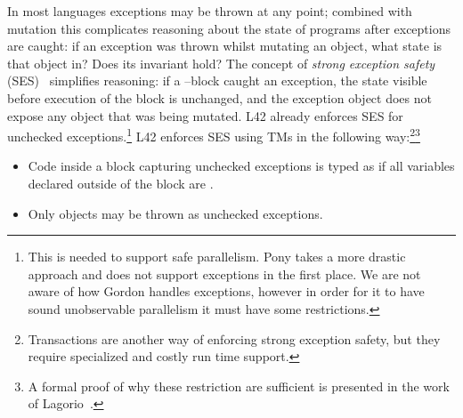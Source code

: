 {}\label{s:exceptions}
In most languages exceptions may be thrown at any point; combined with mutation this complicates reasoning about the state of programs after exceptions are caught: if an exception was thrown whilst mutating an object, what state is that object in? Does its invariant hold?
The concept of \emph{strong exception safety} (SES)~\cite{Abrahams2000,JOT:issue_2011_01/article1} simplifies reasoning:
if a \Q@try@--\Q@catch@ block caught an exception, the state visible before execution of the \Q@try@ block is unchanged, and the exception object does not expose any object that was being mutated.
L42 already enforces SES for unchecked exceptions.\footnote{%
This is needed to support safe parallelism. Pony takes a more drastic approach and does not support exceptions in the first place. 
We are not aware of how Gordon \etal handles exceptions, however in order for it to have sound unobservable parallelism it must have some restrictions.%
}
L42 enforces SES using TMs in the following way:\footnote{Transactions are another way of enforcing strong exception safety, but they require specialized and costly run time support.}\footnote{A formal proof of why these restriction are sufficient is presented in the work of Lagorio~\cite{JOT:issue_2011_01/article1}.}
\begin{itemize}
\item Code inside a \Q@try@ block capturing unchecked exceptions is typed as if all \Q@mut@ variables declared outside of the block are \Q@read@.
\item Only \Q@imm@ objects may be thrown as unchecked exceptions.
\end{itemize} 
